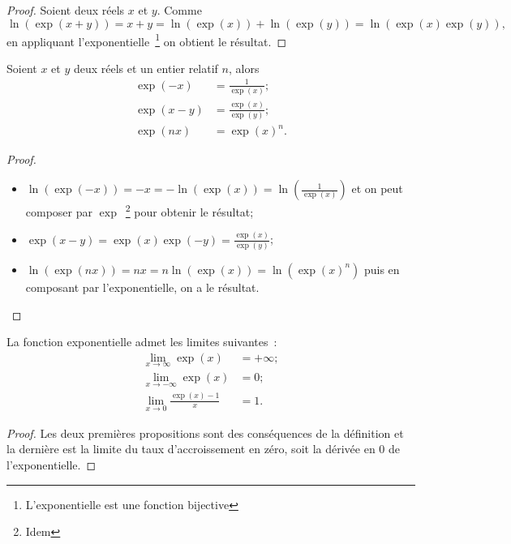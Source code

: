 \begin{proof}
  Soient deux réels \(x\) et \(y\). Comme
  \begin{equation}
    \ln(\exp(x+y))=x+y=\ln(\exp(x))+\ln(\exp(y))=\ln(\exp(x) \exp(y)),
  \end{equation}
  en appliquant l'exponentielle~\footnote{L'exponentielle est une fonction bijective} on obtient le résultat.
\end{proof}
%
\begin{prop}
  Soient \(x\) et \(y\) deux réels et un entier relatif \(n\), alors
  \begin{align}
      \exp(-x)&=\frac{1}{\exp(x)}; \\
      \exp(x-y)&=\frac{\exp(x)}{\exp(y)}; \\
      \exp(nx)&=\exp(x)^n.
  \end{align}
\end{prop}
\begin{proof}
  \begin{itemize}
  \item \(\ln(\exp(-x))=-x=-\ln(\exp(x))=\ln \left(\frac{1}{\exp(x)}\right)\) et on peut composer par \(\exp\)~\footnote{Idem} pour obtenir le résultat;
  \item \(\exp(x-y)=\exp(x) \exp(-y)=\frac{\exp(x)}{\exp(y)}\);
  \item \(\ln(\exp(nx))=nx=n \ln(\exp(x))=\ln(\exp(x)^n)\) puis en composant par l'exponentielle, on a le résultat.
  \end{itemize}
\end{proof}
%
\begin{prop}
  La fonction exponentielle admet les limites suivantes~:
  \begin{align}
      \lim\limits_{x \to \infty} \exp(x)&=+\infty;\\
      \lim\limits_{x \to -\infty} \exp(x)&=0;\\
      \lim\limits_{x \to 0} \frac{\exp(x)-1}{x}&=1.
  \end{align}
\end{prop}
\begin{proof}
  Les deux premières propositions sont des conséquences de la définition et la dernière est la limite du taux d'accroissement en zéro, soit la dérivée en 0 de l'exponentielle.
\end{proof}
%
